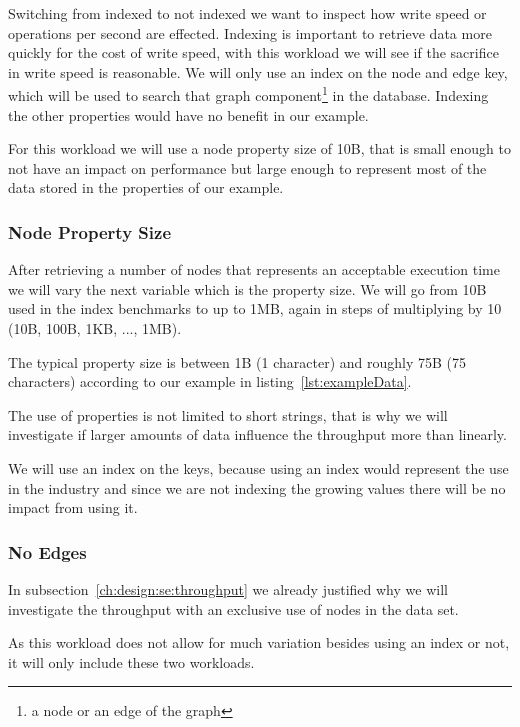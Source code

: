 Switching from indexed to not indexed we want to inspect how write speed or operations per second are effected.
Indexing is important to retrieve data more quickly for the cost of write speed,
with this workload we will see if the sacrifice in write speed is reasonable.
We will only use an index on the node and edge key,
which will be used to search that graph component\footnote{a node or an edge of the graph} in the database.
Indexing the other properties would have no benefit in our example.

For this workload we will use a node property size of 10B,
that is small enough to not have an impact on performance but large enough to represent most of the data stored in the properties of our example.

\subsubsection{Node Property Size}
\label{ch:design:se:nodePropertySize}
After retrieving a number of nodes that represents an acceptable execution time we will vary the next variable which is the property size.
We will go from 10B used in the index benchmarks to up to 1MB,
again in steps of multiplying by 10 (10B, 100B, 1KB, ..., 1MB).

The typical property size is between 1B (1 character) and roughly 75B (75 characters) according to our example in listing~\ref{lst:exampleData}.

The use of properties is not limited to short strings,
that is why we will investigate if larger amounts of data influence the throughput more than linearly.

We will use an index on the keys,
because using an index would represent the use in the industry and since we are not indexing the growing values there will be no impact from using it.

\subsubsection{No Edges}
\label{ch:design:se:noEdges}
In subsection~\ref{ch:design:se:throughput} we already justified why we will investigate the throughput with an exclusive use of nodes in the data set.

As this workload does not allow for much variation besides using an index or not,
it will only include these two workloads.

